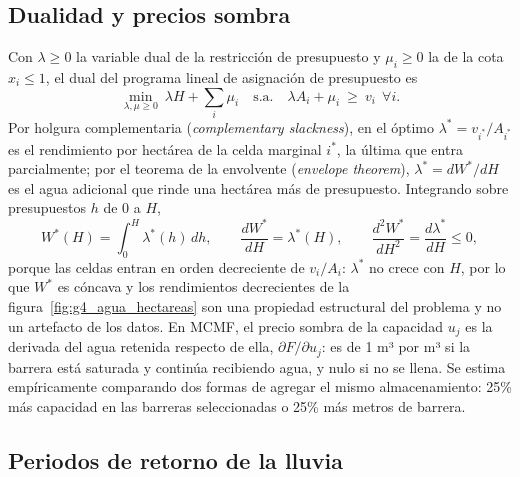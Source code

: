 \documentclass[11pt,letterpaper]{article}
\begin{document}
\subsection{Dualidad y precios sombra}\label{sec:duales}

Con $\lambda\ge0$ la variable dual de la restricción de presupuesto y $\mu_i\ge0$ la de la cota $x_i\le1$, el dual del programa lineal de asignación de presupuesto es
\begin{equation}
\min_{\lambda,\mu\ge0}\ \lambda H+\sum_i\mu_i \quad\text{s.a.}\quad \lambda A_i+\mu_i\ \ge\ v_i\ \ \forall i .
\end{equation}
Por holgura complementaria (\emph{complementary slackness}), en el óptimo $\lambda^\ast = v_{i^\ast}/A_{i^\ast}$ es el rendimiento por hectárea de la celda marginal $i^\ast$, la última que entra parcialmente; por el teorema de la envolvente (\emph{envelope theorem}), $\lambda^\ast = dW^\ast/dH$ es el agua adicional que rinde una hectárea más de presupuesto. Integrando sobre presupuestos $h$ de 0 a $H$,
\begin{equation}
W^\ast(H)=\int_0^H \lambda^\ast(h)\,dh,\qquad \frac{dW^\ast}{dH}=\lambda^\ast(H),\qquad \frac{d^2W^\ast}{dH^2}=\frac{d\lambda^\ast}{dH}\le 0 ,
\end{equation}
porque las celdas entran en orden decreciente de $v_i/A_i$: $\lambda^\ast$ no crece con $H$, por lo que $W^\ast$ es cóncava y los rendimientos decrecientes de la figura~\ref{fig:g4_agua_hectareas} son una propiedad estructural del problema y no un artefacto de los datos. En MCMF, el precio sombra de la capacidad $u_j$ es la derivada del agua retenida respecto de ella, $\partial F/\partial u_j$: es de 1 m³ por m³ si la barrera está saturada y continúa recibiendo agua, y nulo si no se llena. Se estima empíricamente comparando dos formas de agregar el mismo almacenamiento: 25\% más capacidad en las barreras seleccionadas o 25\% más metros de barrera.

\subsection{Periodos de retorno de la lluvia}\label{sec:gumbel}
\end{document}
